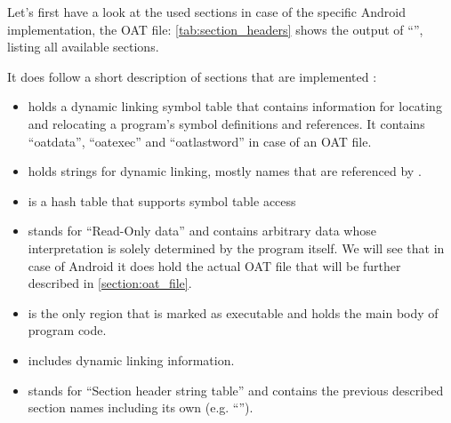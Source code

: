 Let's first have a look at the used sections in case of the specific
Android implementation, the OAT file:
\autoref{tab:section_headers} shows the output of
``'', listing all available sections.


It does follow a short description of sections that are implemented
\parencite{life_of_binaries}:
\begin{itemize}
    \item {} holds a dynamic linking symbol table that
    contains information for locating and relocating a program's
    symbol definitions and references. It contains ``oatdata'',
    ``oatexec'' and ``oatlastword'' in case of an OAT file.
    \item {} holds strings for dynamic linking,
    mostly names that are referenced by .
    \item {} is a hash table that supports symbol table access
    \item {} stands for ``Read-Only data'' and contains arbitrary data whose interpretation is solely
    determined by the program itself. We will
    see that in case of Android it does hold the actual OAT file
    that will be further described in \autoref{section:oat_file}.
    \item {} is the only region that is marked as
    executable and holds the main body of
    program code.
    \item {} includes dynamic linking information.
    \item {} stands for ``Section header string
    table'' and contains the previous described
    section names including its own (e.g. ``'').
\end{itemize}


